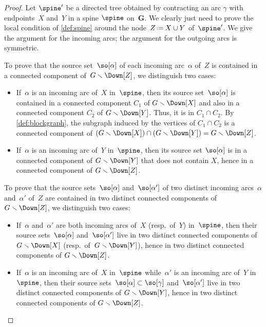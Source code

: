 \documentclass{amsart}
\theoremstyle{definition}
\renewcommand{\b}[1]{{\boldsymbol{#1}}} %
\newcommand{\ssm}{\smallsetminus} %
\newcommand{\eqdef}{\mbox{\,\raisebox{0.2ex}{\scriptsize\ensuremath{\mathrm:}}\ensuremath{=}\,}} %
\begin{document}
\begin{proof} 
  Let $\spine'$ be a directed tree obtained by contracting an arc $\gamma$ with endpoints~$X$ and~$Y$ in a spine $\spine$ on~$\b{G}$.
  We clearly just need to prove the local condition of \cref{def:spine} around the node~$Z \eqdef X \cup Y$ of~$\spine'$.
  We give the argument for the incoming arcs; the argument for the outgoing arcs is symmetric. 

  To prove that the source set~$\so[\alpha]$ of each incoming arc~$\alpha$ of~$Z$ is contained in a connected component of~$G \ssm \Down[Z]$, we distinguish two cases:
  \begin{itemize}
    \item If~$\alpha$ is an incoming arc of~$X$ in~$\spine$, then its source set~$\so[\alpha]$ is contained in a connected component $C_1$ of $G \ssm \Down[X]$ and also in a connected component $C_2$ of $G \ssm \Down[Y]$. Thus, it is in $C_1 \cap C_2$. By \cref{def:blockgraph}, the subgraph induced by the vertices of $C_1 \cap C_2$ is a connected component of $(G \ssm \Down[X]) \cap (G \ssm \Down[Y]) = G \ssm \Down[Z]$.
    \item If~$\alpha$ is an incoming arc of~$Y$ in~$\spine$, then its source set $\so[\alpha]$ is in a connected component of $G \ssm \Down[Y]$ that does not contain $X$, hence in a connected component of $G \ssm \Down[Z]$.
  \end{itemize}

  To prove that the source sets~$\so[\alpha]$ and~$\so[\alpha']$ of two distinct incoming arcs~$\alpha$ and~$\alpha'$ of~$Z$ are contained in two distinct connected components of~$G \ssm \Down[Z]$, we distinguish two cases:
  \begin{itemize}
    \item If~$\alpha$ and~$\alpha'$ are both incoming arcs of~$X$ (resp.~of~$Y$) in~$\spine$, then their source sets~$\so[\alpha]$ and~$\so[\alpha']$ live in two distinct connected components of $G \ssm \Down[X]$ (resp.~of~$G \ssm \Down[Y]$), hence in two distinct connected components of $G\ssm \Down[Z]$.
    \item If~$\alpha$ is an incoming arc of~$X$ in~$\spine$ while~$\alpha'$ is an incoming arc of~$Y$ in~$\spine$, then their source sets~$\so[\alpha] \subset \so[\gamma]$ and~$\so[\alpha']$ live in two distinct connected components of $G \ssm \Down[Y]$, hence in two distinct connected components of $G \ssm \Down[Z]$.
    \qedhere
  \end{itemize}
\end{proof}
\end{document}
